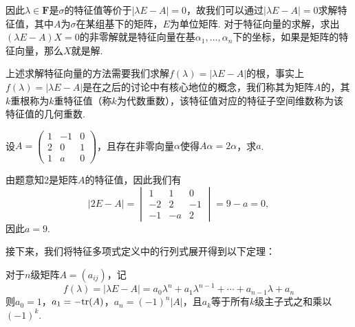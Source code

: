 因此$\lambda\in\mathbf{F}$是$\sigma$的特征值等价于$|\lambda E-A|=0$，故我们可以通过$|\lambda E-A|=0$求解特征值，其中$A$为$\sigma$在某组基下的矩阵，$E$为单位矩阵. 对于特征向量的求解，求出$(\lambda E-A)X=0$的非零解就是特征向量在基$\alpha_1,\ldots,\alpha_n$下的坐标，如果是矩阵的特征向量，那么$X$就是解.

上述求解特征向量的方法需要我们求解$f(\lambda)=|\lambda E-A|$的根，事实上$f(\lambda)=|\lambda E-A|$是在之后的讨论中有核心地位的概念，我们称其为矩阵$A$的，其$k$重根称为$k$重特征值（称$k$为代数重数），该特征值对应的特征子空间维数称为该特征值的几何重数.

\begin{example}
    设$A=\begin{pmatrix}
            1 & -1 & 0 \\ 2 & 0 & 1 \\ 1 & a & 0
        \end{pmatrix}$，且存在非零向量$\alpha$使得$A\alpha=2\alpha$，求$a$.
\end{example}

\begin{solution}
    由题意知2是矩阵$A$的特征值，因此我们有
    \[|2E-A|=\begin{vmatrix}
            1 & 1 & 0 \\ -2 & 2 & -1 \\ -1 & -a & 2
        \end{vmatrix}=9-a=0,\]
    因此$a=9$.
\end{solution}

接下来，我们将特征多项式定义中的行列式展开得到以下定理：
\begin{theorem}\label{thm:18:特征多项式展开}
    对于$n$级矩阵$A=(a_{ij})$，记
    \[f(\lambda)=|\lambda E-A|=a_0\lambda^n+a_1\lambda^{n-1}+\cdots+a_{n-1}\lambda+a_n\]
    则$a_0=1$，$a_1=-\textup{tr}(A)$，$a_n=(-1)^n|A|$，且$a_k$等于所有$k$级主子式之和乘以$(-1)^k$.
\end{theorem}

